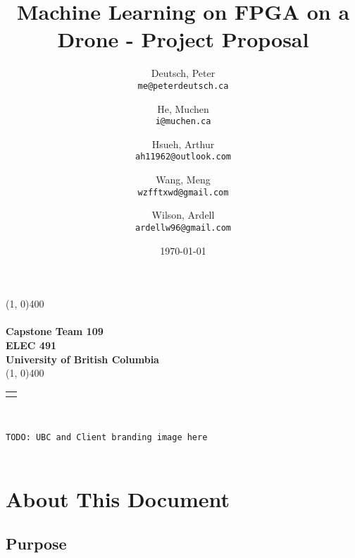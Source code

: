\documentclass[10pt,letterpaper]{article}
\author{
	Deutsch, Peter\\
	\texttt{me@peterdeutsch.ca}
	\and
	He, Muchen\\
	\texttt{i@muchen.ca}
	\and
	Hsueh, Arthur\\
	\texttt{ah11962@outlook.com}
	\and
	Wang, Meng\\
	\texttt{wzfftxwd@gmail.com}
	\and
	Wilson, Ardell\\
	\texttt{ardellw96@gmail.com}
}
\title{Machine Learning on FPGA on a Drone - Project Proposal}
\date{\today}
\begin{document}
\makeatletter %
\begin{titlepage}
	\begin{center}
		\vspace*{1.25in}

		\line(1, 0){400}\\

		\Huge{\textbf{\@title}}\\[0.2cm]

		\large{\textbf{Capstone Team 109}}\\[1cm]

		\Large{\textbf{ELEC 491}}\\
		\textbf{University of British Columbia}\\

		\line(1, 0){400}\\[1cm]

		\begin{tabular}[t]{c}
			\@author
		\end{tabular}\\[2cm]

		\vfill

		\texttt{TODO: UBC and Client branding image here}\\[2cm]

		\@date\\
	\end{center}
\end{titlepage}
\makeatother

% 







\thispagestyle{empty}
\listoffigures
\listoftables
\newpage

\setcounter{page}{1}


\section{About This Document}
\subsection{Purpose}
\end{document}
